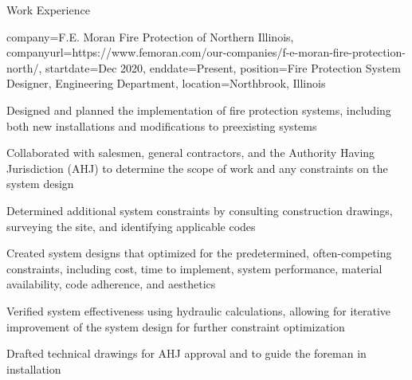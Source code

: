 \documentclass[10pt]{article}
\begin{document}
\begin{resume_sec}
    {Work Experience}

    \begin{subsec}
        {
            company={F.E. Moran Fire Protection of Northern Illinois},
            companyurl={https://www.femoran.com/our-companies/f-e-moran-fire-protection-north/},
            startdate={Dec 2020},
            enddate=Present,
            position={Fire Protection System Designer, Engineering Department},
            location={Northbrook, Illinois}
        }
    
        \item Designed and planned the implementation of fire protection systems, including both new installations and modifications to preexisting systems
        \item Collaborated with salesmen, general contractors, and the Authority Having Jurisdiction (AHJ) to determine the scope of work and any constraints on the system design
        \item Determined additional system constraints by consulting construction drawings, surveying the site, and identifying applicable codes
        \item Created system designs that optimized for the predetermined, often-competing constraints, including cost, time to implement, system performance, material availability, code adherence, and aesthetics
        \item Verified system effectiveness using hydraulic calculations, allowing for iterative improvement of the system design for further constraint optimization
        \item Drafted technical drawings for AHJ approval and to guide the foreman in installation
    \end{subsec}
    

\end{resume_sec}
\end{document}
